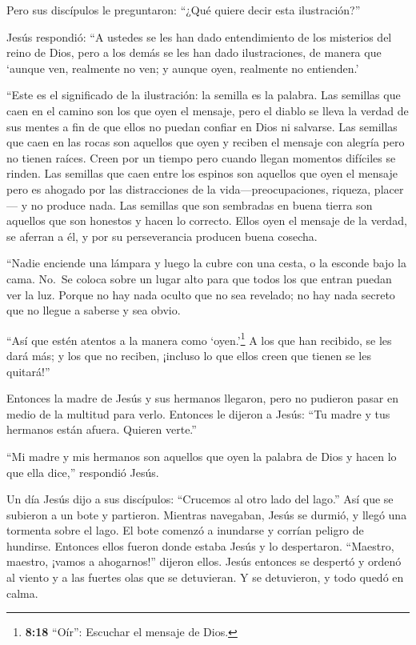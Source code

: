 Pero sus discípulos le preguntaron: ``¿Qué quiere decir
esta ilustración?''

 Jesús respondió: ``A ustedes se les han dado entendimiento
de los misterios del reino de Dios, pero a los demás se les han dado
ilustraciones, de manera que `aunque ven, realmente no ven; y aunque
oyen, realmente no entienden.'

 ``Este es el significado de la ilustración: la semilla es
la palabra.  Las semillas que caen en el camino son los que
oyen el mensaje, pero el diablo se lleva la verdad de sus mentes a fin
de que ellos no puedan confiar en Dios ni salvarse.  Las
semillas que caen en las rocas son aquellos que oyen y reciben el
mensaje con alegría pero no tienen raíces. Creen por un tiempo pero
cuando llegan momentos difíciles se rinden.  Las semillas
que caen entre los espinos son aquellos que oyen el mensaje pero es
ahogado por las distracciones de la vida---preocupaciones, riqueza,
placer--- y no produce nada.  Las semillas que son
sembradas en buena tierra son aquellos que son honestos y hacen lo
correcto. Ellos oyen el mensaje de la verdad, se aferran a él, y por su
perseverancia producen buena cosecha.

 ``Nadie enciende una lámpara y luego la cubre con una
cesta, o la esconde bajo la cama. No.~Se coloca sobre un lugar alto para
que todos los que entran puedan ver la luz.  Porque no hay
nada oculto que no sea revelado; no hay nada secreto que no llegue a
saberse y sea obvio.

 ``Así que estén atentos a la manera como
`oyen.'\footnote{\textbf{8:18} ``Oír'': Escuchar el mensaje de Dios.} A
los que han recibido, se les dará más; y los que no reciben, ¡incluso lo
que ellos creen que tienen se les quitará!''

 Entonces la madre de Jesús y sus hermanos llegaron, pero
no pudieron pasar en medio de la multitud para verlo. 
Entonces le dijeron a Jesús: ``Tu madre y tus hermanos están afuera.
Quieren verte.''

 ``Mi madre y mis hermanos son aquellos que oyen la palabra
de Dios y hacen lo que ella dice,'' respondió Jesús.

 Un día Jesús dijo a sus discípulos: ``Crucemos al otro
lado del lago.'' Así que se subieron a un bote y partieron.
 Mientras navegaban, Jesús se durmió, y llegó una tormenta
sobre el lago. El bote comenzó a inundarse y corrían peligro de
hundirse.  Entonces ellos fueron donde estaba Jesús y lo
despertaron. ``Maestro, maestro, ¡vamos a ahogarnos!'' dijeron ellos.
Jesús entonces se despertó y ordenó al viento y a las fuertes olas que
se detuvieran. Y se detuvieron, y todo quedó en calma.

